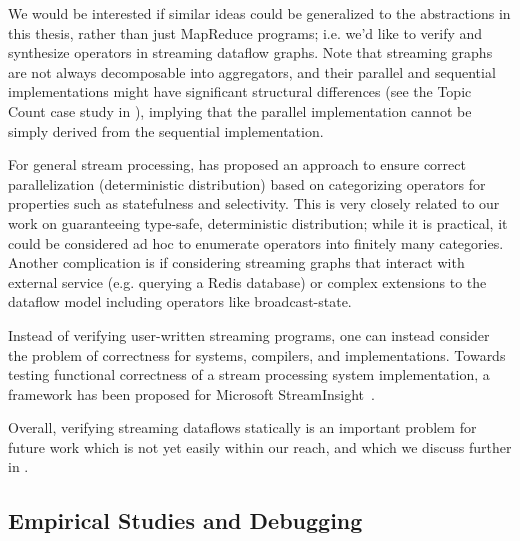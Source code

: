 We would be interested if similar ideas could be generalized to the abstractions in this thesis,
rather than just MapReduce programs;
i.e. we'd like to verify and synthesize operators in streaming dataflow graphs.
Note that streaming graphs are not always decomposable into aggregators, and their parallel
and sequential implementations might have significant structural
differences (see the Topic Count case study in
), implying that the parallel implementation cannot be simply
derived from the sequential implementation.

For general stream processing, \cite{schneider2013safe} has proposed an approach to ensure correct parallelization (deterministic distribution) based on categorizing operators for properties such as statefulness and selectivity.
This is very closely related to our work on guaranteeing type-safe, deterministic distribution;
while it is practical, it could be considered ad hoc to enumerate operators into finitely many categories.
Another complication is if considering streaming graphs that interact with external service (e.g. querying a Redis database) or complex extensions to the dataflow model including operators like broadcast-state.

Instead of verifying user-written streaming programs, one can instead consider the problem of correctness for systems, compilers, and implementations.
Towards testing functional correctness of a stream processing system implementation, a framework has been proposed for Microsoft StreamInsight~\cite{raizman2010extensible}.

Overall, verifying streaming dataflows statically is an important problem for future work which is not yet easily within our reach, and which we discuss further in .

\subsection{Empirical Studies and Debugging}

